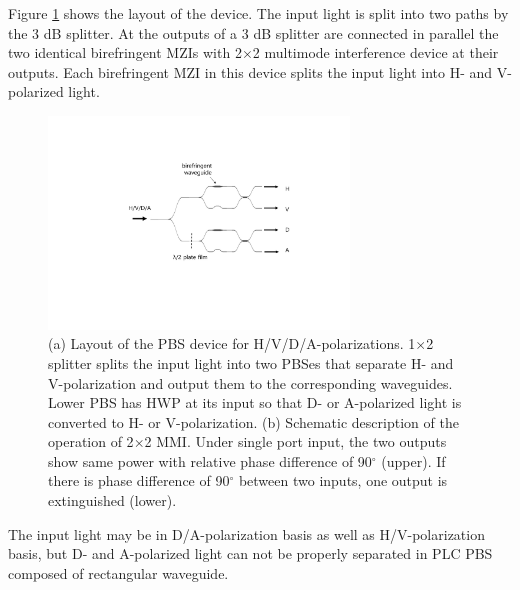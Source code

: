 \documentclass[letterpaper, 10pt]{article}
\begin{document}
Figure \ref{fig:layout} shows the layout of the device.
The input light is split into two paths by the 3 dB splitter.
At the outputs of a 3 dB splitter are connected in parallel the two identical birefringent MZIs with 2$\times$2 multimode interference device at their outputs.
Each birefringent MZI in this device splits the input light into H- and V-polarized light.
\begin{figure}
  \centering
  \includegraphics[width=8cm]{./layout}
  \caption{(a) Layout of the PBS device for H/V/D/A-polarizations. 1$\times$2 splitter splits the input light into two PBSes that separate H- and V-polarization and output them to the corresponding waveguides. Lower PBS has HWP at its input so that D- or A-polarized light is converted to H- or V-polarization. (b) Schematic description of the operation of 2$\times$2 MMI. Under single port input, the two outputs show same power with relative phase difference of 90$^\circ$ (upper). If there is phase difference of 90$^\circ$ between two inputs, one output is extinguished (lower).}
  \label{fig:layout}
\end{figure}
The input light may be in D/A-polarization basis as well as H/V-polarization basis, but D- and A-polarized light can not be properly separated in PLC PBS composed of rectangular waveguide.
\end{document}

